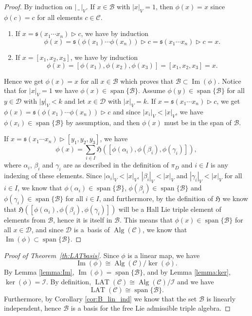 \documentclass[10pt,a4paper]{amsart}
\newcommand{\Img}{\operatorname{Im}}
\newcommand*{\LAT}{\operatorname{LAT}}
\newcommand*{\Alg}{\operatorname{Alg}}
\newcommand{\spn}{\operatorname{span}}
\newcommand{\I}{\mathcal{I}}
\newcommand{\noarg}{\,\_\,}
\numberwithin{equation}{section}
\begin{document}
\begin{proof}
By induction on $|\noarg |_V$. %
If $x \in \mathcal{B}$ with $|x|_V=1$, then $\phi(x) = x$ since $\phi(c)=c$ for all elements $c \in \mathcal{C}$. %
\begin{enumerate}\itemsep=0pt
 \item[(i)] If $x = \mathfrak{s}(x_1 \cdots x_n) \rhd c$, we have by induction
 \[
 \phi(x) = \mathfrak{s}(\phi(x_1) \cdots \phi(x_n))\rhd c = \mathfrak{s}(x_1 \cdots x_n) \rhd c = x.
 \]
 \item[(ii)] If $x = [x_1, x_2, x_3]$, we have by induction
 \[
 \phi(x) = [\phi(x_1),\phi(x_2),\phi(x_3)] = [x_1, x_2, x_3] = x.
 \]
\end{enumerate}
Hence we get $\phi(x)=x$ for all $x \in \mathcal{B}$ which proves that $\mathcal{B} \subset \Img(\phi)$.
Notice that for $|x|_V=1$ we have $\phi(x) \in \spn\{\mathcal{B} \}$. Assume $\phi(y) \in \spn \{\mathcal{B}\}$ for all $y\in \mathcal{D}$ with $|y|_V < k$ and let $x \in \mathcal{D}$ with $|x|_V=k$. If $x = \mathfrak{s}(x_1 \cdots x_n) \rhd c$, we get $\phi(x) = \mathfrak{s}( \phi(x_1) \cdots \phi(x_n)) \rhd c$ and since $|x_i|_V < |x|_V$, we have $\phi(x_i) \in \spn\{ \mathcal{B} \}$ by assumption, and then $\phi(x)$ must be in the span of $\mathcal{B}$.

If $x = \mathfrak{s}(x_1 \cdots x_n) \rhd [y_1, y_2 ,y_3]$, we have
\[
\phi(x) = \sum_{i \in I} \mathfrak{H}([\phi(\alpha_i), \phi(\beta_i), \phi(\gamma_i)]),
\]
where $\alpha_i$, $\beta_i$ and $\gamma_i$ are as described in the definition of $\pi_D$ and $i\in I$ is any indexing of these elements. Since $|\alpha_i|_V<|x|_V$, $|\beta_i|_V<|x|_V$ and $|\gamma_i|_V<|x|_V$ for all $i \in I$, we know that $\phi(\alpha_i) \in \spn \{ \mathcal{B} \}$, $\phi(\beta_i) \in \spn \{ \mathcal{B} \}$ and $\phi(\gamma_i) \in \spn \{ \mathcal{B} \}$ for all $i \in I$, and furthermore, by the definition of $\mathfrak{H}$ we know that $\mathfrak{H}([\phi(\alpha_i), \phi(\beta_i), \phi(\gamma_i)])$ will be a Hall Lie triple element of elements from $\mathcal{B}$, hence it is itself in $\mathcal{B}$.
This means that $\phi(x) \in \spn \{\mathcal{B}\}$ for all $x \in \mathcal{D}$, and since $\mathcal{D}$ is a~basis of $\Alg(\mathcal{C})$, we know that $\Img(\phi) \subset \spn \{\mathcal{B}\}$.
\end{proof}

\begin{proof}[Proof of Theorem~\ref{th:LATbasis}]%
Since $\phi$ is a linear map, we have
\[
\Img(\phi) \cong \Alg(\mathcal{C})/\ker(\phi).
\]
By Lemma \ref{lemma:Im}, $\Img(\phi) = \spn \{\mathcal{B} \}$, and by Lemma \ref{lemma:ker}, $\ker(\phi) = \I$. By definition, $\LAT(\mathcal{C}) \cong \Alg(\mathcal{C})/ \I$ and we have
\[
\LAT(\mathcal{C}) \cong \spn \{ \mathcal{B} \}.
\]
Furthermore, by Corollary \ref{cor:B_lin_ind} we know that the set $\mathcal{B}$ is linearly independent, hence $\mathcal{B}$ is a basis for the free Lie admissible triple algebra.
\end{proof}
\end{document}
